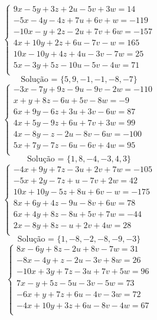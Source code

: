 \documentclass[12pt,oneside,a4paper]{article}
\begin{document}
\vspace{\baselineskip}
\begin{equation*}
\begin{cases}
9x-5y+3z+2u-5v+3w=14 \\
-5x-4y-4z+7u+6v+w=-119 \\
-10x-y+2z-2u+7v+6w=-157 \\
4x+10y+2z+6u-7v-w=165 \\
10x-10y+4z+4u-3v-7w=25 \\
5x-3y+5z-10u-5v-4w=71 \\
\end{cases}
\end{equation*}
\begin{equation*}
\text{Solução = }\{5,9,-1,-1,-8,-7\}
\end{equation*}
\vspace{\baselineskip}
\begin{equation*}
\begin{cases}
-3x-7y+9z-9u-9v-2w=-110 \\
x+y+8z-6u+5v-8w=-9 \\
6x+9y-6z+3u+3v-6w=87 \\
4x+5y-9z+6u+7v+3w=99 \\
4x-8y-z-2u-8v-6w=-100 \\
5x+7y-7z-6u-6v+4w=95 \\
\end{cases}
\end{equation*}
\begin{equation*}
\text{Solução = }\{1,8,-4,-3,4,3\}
\end{equation*}
\vspace{\baselineskip}
\begin{equation*}
\begin{cases}
-4x+9y+7z-3u+2v+7w=-105 \\
-5x+2y-7z+u-7v+2w=42 \\
10x+10y-5z+8u+6v-w=-175 \\
8x+6y+4z-9u-8v+6w=78 \\
6x+4y+8z-8u+5v+7w=-44 \\
2x-8y+8z-u+2v+4w=28 \\
\end{cases}
\end{equation*}
\begin{equation*}
\text{Solução = }\{1,-8,-2,-8,-9,-3\}
\end{equation*}
\vspace{\baselineskip}
\begin{equation*}
\begin{cases}
8x-6y+8z-2u+8v-7w=31 \\
-8x-4y+z-2u-3v+8w=26 \\
-10x+3y+7z-3u+7v+5w=96 \\
7x-y+5z-5u-3v-5w=73 \\
-6x+y+7z+6u-4v-3w=72 \\
-4x+10y+3z+6u-8v-4w=67 \\
\end{cases}
\end{equation*}
\end{document}
